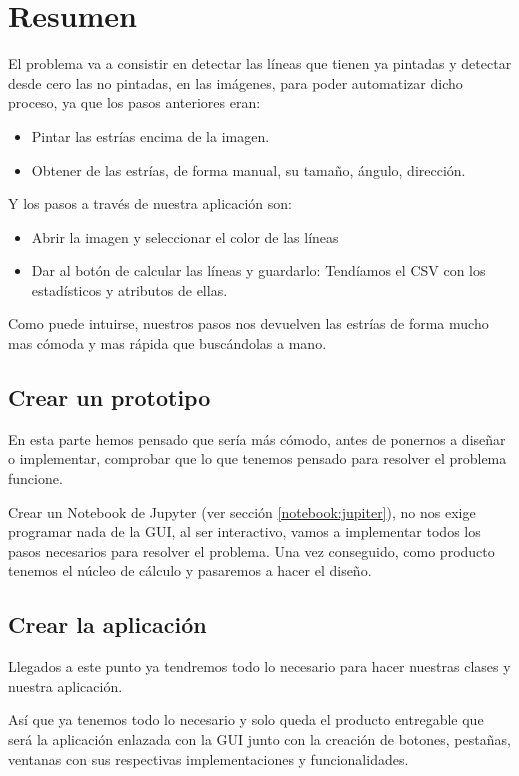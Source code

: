 \section{Resumen}

El problema va a consistir en detectar las líneas que tienen ya pintadas y detectar desde cero las no pintadas, en las imágenes, para poder automatizar dicho proceso, ya que los pasos anteriores eran:
\begin{itemize}
\item Pintar las estrías encima de la imagen.
\item Obtener de las estrías, de forma manual, su tamaño, ángulo, dirección.
\end{itemize}
Y los pasos a través de nuestra aplicación son:
\begin{itemize}
\item Abrir la imagen y seleccionar el color de las líneas
\item Dar al botón de calcular las líneas y guardarlo: Tendíamos el CSV con los estadísticos y atributos de ellas.
\end{itemize}
Como puede intuirse, nuestros pasos nos devuelven las estrías de forma mucho mas cómoda y mas rápida que buscándolas a mano.

\subsection{Crear un prototipo} 
En esta parte hemos pensado que sería más cómodo, antes de ponernos a diseñar o implementar, comprobar que lo que tenemos pensado para resolver el problema funcione.

Crear un Notebook de Jupyter (ver sección \ref{notebook:jupiter}), no nos exige programar nada de la GUI, al ser interactivo, vamos a implementar todos los pasos necesarios para resolver el problema. 
Una vez conseguido, como producto tenemos el núcleo de cálculo y pasaremos a hacer el diseño.

\subsection{Crear la aplicación}
Llegados a este punto ya tendremos todo lo necesario para hacer nuestras clases y nuestra aplicación.

Así que ya tenemos todo lo necesario y solo queda el producto entregable que será la aplicación enlazada con la GUI junto con la creación de botones, pestañas, ventanas con sus respectivas implementaciones y funcionalidades.